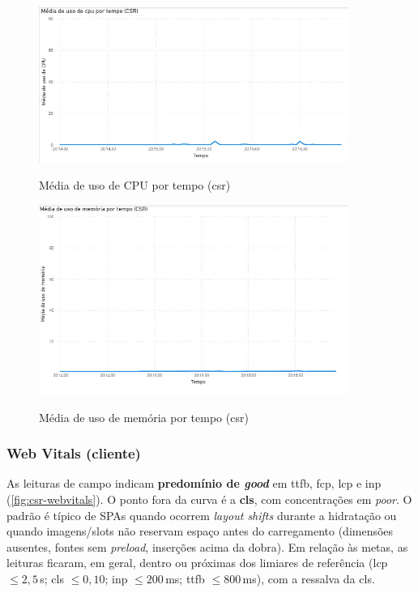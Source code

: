 \begin{figure}[H]
\centering
\caption{Média de uso de CPU por tempo (\acrshort{csr})}
\includegraphics[width=0.9\textwidth]{media/uso_cpu_csr.jpeg}
\label{fig:csr-cpu}
\end{figure}

\begin{figure}[H]
\centering
\caption{Média de uso de memória por tempo (\acrshort{csr})}
\includegraphics[width=0.9\textwidth]{media/uso_memoria_csr.jpeg}
\label{fig:csr-mem}
\end{figure}

\subsubsection*{Web Vitals (cliente)}
As leituras de campo indicam \textbf{predomínio de \textit{good}} em \acrshort{ttfb}, \acrshort{fcp}, \acrshort{lcp} e \acrshort{inp} (\autoref{fig:csr-webvitals}). O ponto fora da curva é a \textbf{\acrshort{cls}}, com concentrações em \textit{poor}. O padrão é típico de SPAs quando ocorrem \emph{layout shifts} durante a hidratação ou quando imagens/slots não reservam espaço antes do carregamento (dimensões ausentes, fontes sem \emph{preload}, inserções acima da dobra). Em relação às metas, as leituras ficaram, em geral, dentro ou próximas dos limiares de referência (\acrshort{lcp} $\leq 2{,}5$\,s; \acrshort{cls} $\leq 0{,}10$; \acrshort{inp} $\leq 200$\,ms; \acrshort{ttfb} $\leq 800$\,ms), com a ressalva da \acrshort{cls}.

